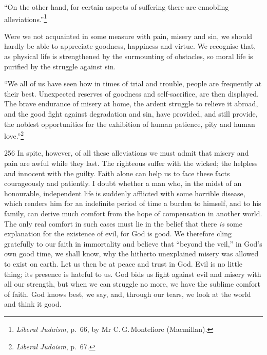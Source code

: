 “On the other hand, for certain aspects of
suffering there are ennobling
alleviations.”\footnote{\textsl{Liberal Judaism}, p.\ 66,
by Mr C.\,G.\,Montefiore (Macmillan).}

Were we not acquainted in some measure
with pain, misery and sin, we should hardly
be able to appreciate goodness, happiness
and virtue. We recognise that, as physical
life is strengthened by the surmounting of
obstacles, so moral life is purified by the
struggle against sin.

“We all of us have seen how in times of
trial and trouble, people are frequently at
their best. Unexpected reserves of goodness
and self-sacrifice, are then displayed.
The brave endurance of misery at home, the
ardent struggle to relieve it abroad, and the
good fight against degradation and sin, have
provided, and still provide, the noblest
opportunities for the exhibition of human
patience, pity and human love.”\footnote{\textsl{Liberal
  Judaism}, p.\ 67.}

\begin{tp}{256}
In spite, however, of all these alleviations
we must admit that misery and pain are
awful while they last. The righteous suffer
with the wicked; the helpless and innocent
with the guilty. Faith alone can help us to
face these facts courageously and patiently.
I doubt whether a man who, in the
midst of an honourable, independent life
is suddenly afflicted with some horrible
disease, which renders him for an indefinite
period of time a burden to himself, and to his
family, can derive much comfort from the
hope of compensation in another world.
The only real comfort in such cases must lie
in the belief that there \textsl{is} some explanation
for the existence of evil, for God is good.
We therefore cling gratefully to our faith in
immortality and believe that “beyond the
veil,” in God’s own good time, we shall
know, why the hitherto unexplained misery
was allowed to exist on earth. Let us
then be at peace and trust in God. Evil
is no little thing; its presence is hateful to
us. God bids us fight against evil and
misery with all our strength, but when we
can struggle no more, we have the sublime
comfort of faith. God knows best, we say,
and, through our tears, we look at the world
and think it good.
\end{tp}

